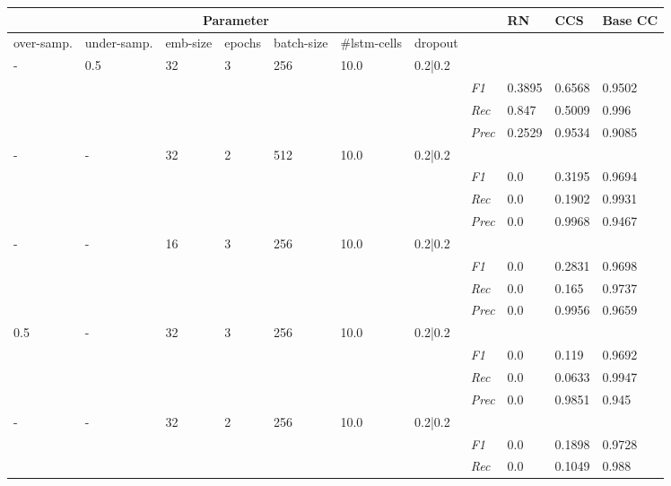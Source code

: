     \begin{table}[H]
    \tiny
    \tabcolsep=0.11cm
    \begin{tabularx}{\textwidth}{XXXXXXX|X|X|X|X}
    \toprule
    \multicolumn{7}{c}{Parameter} & & RN & CCS & Base CC \\ \midrule
    over-\newline samp. & under-\newline samp. & emb-\newline size & epochs &batch-\newline size & \#lstm-\newline cells & dropout & & & & \\ \midrule
    - & 0.5 & 32 & 3 & 256 &10.0 & 0.2|0.2 & & & & \\
    & & & & & & & \textit{F1} & 0.3895 & 0.6568 & 0.9502       \\
    & & & & & & & \textit{Rec} &  0.847 & 0.5009  & 0.996  \\
    & & & & & & & \textit{Prec} & 0.2529 & 0.9534 & 0.9085 \\ \midrule
    - & - & 32 & 2 & 512 &10.0 & 0.2|0.2 & & & & \\
    & & & & & & & \textit{F1} & 0.0 & 0.3195 & 0.9694       \\
    & & & & & & & \textit{Rec} &  0.0 & 0.1902  & 0.9931  \\
    & & & & & & & \textit{Prec} & 0.0 & 0.9968 & 0.9467 \\ \midrule
    - & - & 16 & 3 & 256 &10.0 & 0.2|0.2 & & & & \\
    & & & & & & & \textit{F1} & 0.0 & 0.2831 & 0.9698       \\
    & & & & & & & \textit{Rec} &  0.0 & 0.165  & 0.9737  \\
    & & & & & & & \textit{Prec} & 0.0 & 0.9956 & 0.9659 \\ \midrule
    0.5 & - & 32 & 3 & 256 &10.0 & 0.2|0.2 & & & & \\
    & & & & & & & \textit{F1} & 0.0 & 0.119 & 0.9692       \\
    & & & & & & & \textit{Rec} &  0.0 & 0.0633  & 0.9947  \\
    & & & & & & & \textit{Prec} & 0.0 & 0.9851 & 0.945 \\ \midrule
    - & - & 32 & 2 & 256 &10.0 & 0.2|0.2 & & & & \\
    & & & & & & & \textit{F1} & 0.0 & 0.1898 & 0.9728       \\
    & & & & & & & \textit{Rec} &  0.0 & 0.1049  & 0.988  \\

\end{tabularx}
\end{table}
